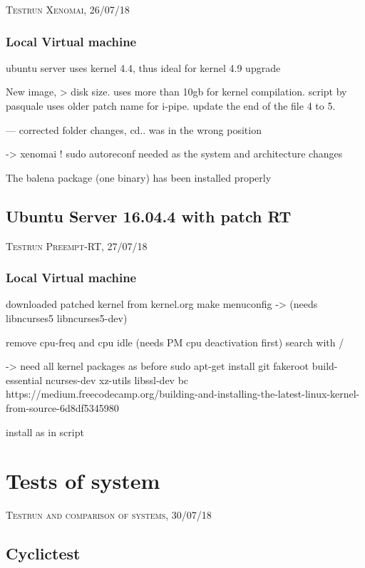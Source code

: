 \documentclass[]{scrartcl}
\begin{document}
{\small\textsc{Testrun Xenomai, 26/07/18} \bigskip}

\subsubsection{Local Virtual machine}

ubuntu server uses kernel 4.4, thus ideal for kernel 4.9 upgrade

New image, > disk size. uses more than 10gb for kernel compilation. script by pasquale uses older patch name for i-pipe. update the end of the file 4 to 5.

--- corrected folder changes, cd.. was in the wrong position

-> xenomai ! sudo autoreconf
needed as the system and architecture changes

The balena package (one binary) has been installed properly


\subsection{Ubuntu Server 16.04.4 with patch RT}

{\small\textsc{Testrun Preempt-RT, 27/07/18} \bigskip}


\subsubsection{Local Virtual machine}

downloaded patched kernel from kernel.org
make menuconfig
-> (needs libncurses5 libncurses5-dev)

remove cpu-freq and cpu idle (needs PM cpu deactivation first)
search with /

-> need all kernel packages as before
sudo apt-get install git fakeroot build-essential ncurses-dev xz-utils libssl-dev bc
https://medium.freecodecamp.org/building-and-installing-the-latest-linux-kernel-from-source-6d8df5345980

install as in script

\section{Tests of system}

{\small\textsc{Testrun and comparison of systems, 30/07/18} \bigskip}

\subsection{Cyclictest}
\end{document}
